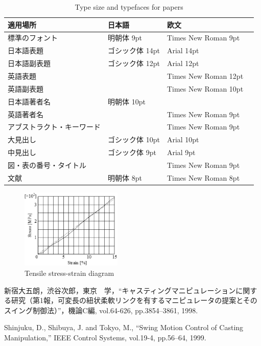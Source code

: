 \documentclass{jarticle}
\begin{document}
\begin{table}[tb]
 \caption{Type size and typefaces for papers}
 \label{tbl: table1}
 \centering
 \footnotesize
 \begin{tabular}{|p{}|l|l|l|}
  \hline
	適用場所	&日本語	&欧文 \\\hline
	標準のフォント	&明朝体 9pt	&Times New Roman 9pt \\\hline
	日本語表題	&ゴシック体 14pt	&Arial 14pt \\\hline
	日本語副表題	&ゴシック体 12pt	&Arial 12pt \\\hline
	英語表題	&&Times New Roman 12pt \\\hline
	英語副表題	&&Times New Roman 10pt \\\hline
	日本語著者名	&明朝体 10pt &\\\hline
	英語著者名	&&Times New Roman 9pt \\\hline
	アブストラクト・キーワード	&&Times New Roman 9pt \\\hline
	大見出し	&ゴシック体 10pt	&Arial 10pt \\\hline
	中見出し	&ゴシック体 9pt	&Arial 9pt \\\hline
	図・表の番号・タイトル	 &&Times New Roman 9pt \\\hline
	文献	&明朝体 8pt	&Times New Roman 8pt \\
  \hline
 \end{tabular}
\end{table}

\begin{figure}[tb]
 \centering
  \includegraphics[height=38mm]{figs/fig1.eps}
  \vspace*{-4mm}
  \caption{Tensile stress-strain diagram}
  \label{fig: fig1}
\end{figure}


\footnotesize
\begin{thebibliography}{99}

新宿大五朗，渋谷次郎，東京　学，``キャスティングマニピュレーションに関する研究（第1報，可変長の紐状柔軟リンクを有するマニピュレータの提案とそのスイング制御法）''，機論C編, vol.64-626, pp.3854--3861, 1998.

Shinjuku, D., Shibuya, J. and Tokyo, M., ``Swing Motion Control of Casting Manipulation,'' IEEE Control Systems, vol.19-4, pp.56--64, 1999.

\end{thebibliography}

\normalsize
\end{document}
